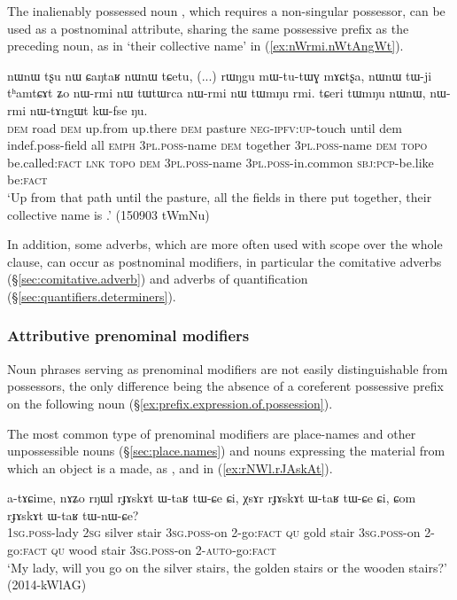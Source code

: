 The inalienably possessed noun , which requires a non-singular possessor, can be used as a postnominal attribute, sharing the same possessive prefix as the preceding noun, as in  `their collective name' in (\ref{ex:nWrmi.nWtAngWt}).

\begin{exe}
\ex \label{ex:nWrmi.nWtAngWt}
\gll nɯnɯ tʂu nɯ ɕaŋtaʁ nɯnɯ tɕetu, (...) rɯŋgu mɯ-tu-tɯɣ mɤɕtʂa, nɯnɯ tɯ-ji tʰamtɕɤt ʑo nɯ-rmi nɯ tɯtɯrca nɯ-rmi nɯ tɯmŋu rmi.  tɕeri tɯmŋu nɯnɯ, nɯ-rmi nɯ-tɤngɯt kɯ-fse ŋu. \\
\textsc{dem} road \textsc{dem} up.from up.there \textsc{dem} {  } pasture \textsc{neg}-\textsc{ipfv}:\textsc{up}-touch until dem indef.poss-field all \textsc{emph} \textsc{3pl}.\textsc{poss}-name \textsc{dem} together \textsc{3pl}.\textsc{poss}-name \textsc{dem}  \textsc{topo} be.called:\textsc{fact} \textsc{lnk}  \textsc{topo} \textsc{dem}  \textsc{3pl}.\textsc{poss}-name  \textsc{3pl}.\textsc{poss}-in.common \textsc{sbj}:\textsc{pcp}-be.like be:\textsc{fact} \\
\glt `Up from that path until the pasture, all the fields in there put together, their collective name is .' (150903 tWmNu)
\end{exe}

In addition, some adverbs, which are more often used with scope over the whole clause, can occur as postnominal modifiers, in particular the comitative adverbs (§\ref{sec:comitative.adverb}) and adverbs of quantification (§\ref{sec:quantifiers.determiners}).

 
\subsubsection{Attributive prenominal modifiers}   \label{ex:attributive.prenominal}
Noun phrases serving as prenominal modifiers are not easily distinguishable from possessors, the only difference being the absence of a coreferent possessive prefix on the following noun (§\ref{ex:prefix.expression.of.possession}). 

The most common type of prenominal modifiers are place-names and other unpossessible nouns (§\ref{sec:place.names}) and nouns expressing the material from which an object is a made, as ,  and  in (\ref{ex:rNWl.rJAskAt}).

\begin{exe}
\ex \label{ex:rNWl.rJAskAt}
\gll a-tɤɕime, nɤʑo rŋɯl rɟɤskɤt ɯ-taʁ tɯ-ɕe ɕi, χsɤr rɟɤskɤt ɯ-taʁ tɯ-ɕe ɕi, ɕom rɟɤskɤt ɯ-taʁ tɯ-nɯ-ɕe? \\
\textsc{1sg}.\textsc{poss}-lady \textsc{2sg} silver stair \textsc{3sg}.\textsc{poss}-on 2-go:\textsc{fact}  \textsc{qu} gold stair \textsc{3sg}.\textsc{poss}-on 2-go:\textsc{fact} \textsc{qu} wood stair \textsc{3sg}.\textsc{poss}-on 2-\textsc{auto}-go:\textsc{fact} \\
\glt `My lady, will you go on the silver stairs, the golden stairs or the wooden stairs?' (2014-kWlAG)
\end{exe}

